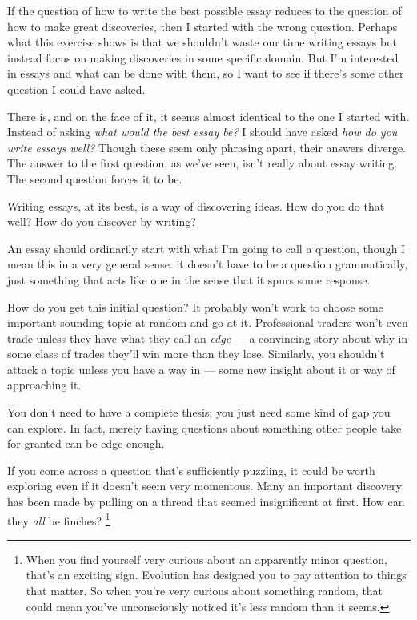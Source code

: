 If the question of how to write the best possible essay reduces to the
question of how to make great discoveries, then I started with the wrong
question. Perhaps what this exercise shows is that we shouldn't waste
our time writing essays but instead focus on making discoveries in some
specific domain. But I'm interested in essays and what can be done with
them, so I want to see if there's some other question I could have
asked.

There is, and on the face of it, it seems almost identical to the one I
started with. Instead of asking \emph{what would the best essay be?} I
should have asked \emph{how do you write essays well?} Though these seem
only phrasing apart, their answers diverge. The answer to the first
question, as we've seen, isn't really about essay writing. The second
question forces it to be.

Writing essays, at its best, is a way of discovering ideas. How do you
do that well? How do you discover by writing?

An essay should ordinarily start with what I'm going to call a question,
though I mean this in a very general sense: it doesn't have to be a
question grammatically, just something that acts like one in the sense
that it spurs some response.

How do you get this initial question? It probably won't work to choose
some important-sounding topic at random and go at it. Professional
traders won't even trade unless they have what they call an \emph{edge}
--- a convincing story about why in some class of trades they'll win
more than they lose. Similarly, you shouldn't attack a topic unless you
have a way in --- some new insight about it or way of approaching it.

You don't need to have a complete thesis; you just need some kind of gap
you can explore. In fact, merely having questions about something other
people take for granted can be edge enough.

If you come across a question that's sufficiently puzzling, it could be
worth exploring even if it doesn't seem very momentous. Many an
important discovery has been made by pulling on a thread that seemed
insignificant at first. How can they \emph{all} be finches?
\footnote{When you find yourself very curious about an apparently minor
question, that's an exciting sign. Evolution has designed you to pay
attention to things that matter. So when you're very curious about
something random, that could mean you've unconsciously noticed it's less
random than it seems.}

